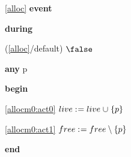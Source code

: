 \noindent \ref{alloc}  \textbf{event}
\begin{block}
  \item   \textbf{during}
  \begin{block}
  \item[ (\ref{alloc}/default) ]{$\false $} %
  \end{block}
  \item   \textbf{any} p
  \item   \textbf{begin}
  \begin{block}
  \item[ \eqref{allocm0:act0} ]{$live \mathrel{:\mkern1mu=} live \mathbin{\mkern1mu\cup\mkern1mu} \{ p \} $} %
  \item[ \eqref{allocm0:act1} ]{$free \mathrel{:\mkern1mu=} free \setminus \{ p \} $} %
  \end{block}
  \item   \textbf{end} \\
\end{block}
